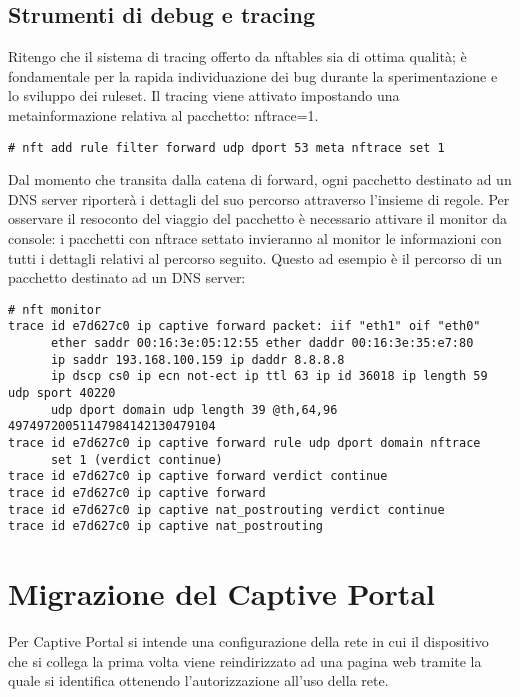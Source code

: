 \section{Strumenti di debug e tracing}
Ritengo che il sistema di tracing offerto da nftables sia di ottima qualit\`a;
\`e fondamentale per la rapida individuazione dei bug durante la
sperimentazione e lo sviluppo dei ruleset.
Il tracing viene attivato impostando una metainformazione relativa al pacchetto: nftrace=1.
\begin{lstlisting}
# nft add rule filter forward udp dport 53 meta nftrace set 1
\end{lstlisting}
Dal momento che transita dalla catena di forward, ogni pacchetto destinato ad un DNS server riporter\`a
i dettagli del suo percorso attraverso l'insieme di regole.
Per osservare il resoconto del viaggio del pacchetto \`e necessario attivare il
monitor da console: i pacchetti con nftrace settato invieranno al monitor le informazioni
con tutti i dettagli relativi al percorso seguito.
Questo ad esempio \`e il percorso di un pacchetto destinato ad un DNS server:
\begin{lstlisting}[style=customc]
# nft monitor
trace id e7d627c0 ip captive forward packet: iif "eth1" oif "eth0" 
      ether saddr 00:16:3e:05:12:55 ether daddr 00:16:3e:35:e7:80 
      ip saddr 193.168.100.159 ip daddr 8.8.8.8 
      ip dscp cs0 ip ecn not-ect ip ttl 63 ip id 36018 ip length 59 udp sport 40220 
      udp dport domain udp length 39 @th,64,96 49749720051147984142130479104
trace id e7d627c0 ip captive forward rule udp dport domain nftrace 
      set 1 (verdict continue)
trace id e7d627c0 ip captive forward verdict continue
trace id e7d627c0 ip captive forward
trace id e7d627c0 ip captive nat_postrouting verdict continue
trace id e7d627c0 ip captive nat_postrouting
\end{lstlisting}

\chapter{Migrazione del Captive Portal}


Per Captive Portal si intende una configurazione della rete in cui il
dispositivo che si collega la prima volta viene reindirizzato ad una pagina web
tramite la quale si identifica ottenendo l'autorizzazione all'uso della rete.

